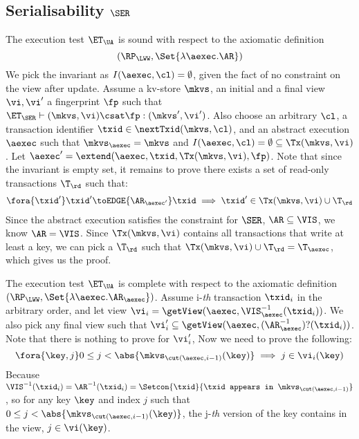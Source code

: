 \subsection{Serialisability \( \SER \)}
\label{sec:sound-complete-ser}

The execution test $\ET_\UA$ is sound with respect to the axiomatic definition 
\[ 
    (\RP_{\LWW}, \Set{\lambda \aexec. \AR })
\]
We pick the invariant as \( I( \aexec, \cl ) = \emptyset \), given the fact of no constraint on the view after update.
Assume a kv-store $\mkvs$, an initial and a final view $\vi, \vi'$  a fingerprint $\fp$ 
such that $\ET_{\SER} \vdash (\mkvs, \vi) \csat \fp: (\mkvs',\vi')$. 
Also choose an arbitrary $\cl$, a transaction identifier $\txid \in \nextTxid(\mkvs, \cl)$, 
and an abstract execution $\aexec$ such that $\mkvs_{\aexec} = \mkvs$ and 
\( I(\aexec, \cl) =  \emptyset \subseteq \Tx(\mkvs, \vi) \).
Let \( \aexec' = \extend(\aexec, \txid, \Tx(\mkvs, \vi), \fp ) \).
Note that since the invariant is empty set, it remains to prove there exists a set of read-only transactions \( \T_\rd \) such that:
\[
    \begin{array}{@{}l@{}}
        \fora{ \txid' } 
        \txid' \toEDGE{\AR_{\aexec'}} \txid \implies \txid' \in \Tx(\mkvs, \vi) \cup \T_\rd
    \end{array}
\]
Since the abstract execution satisfies the constraint for \( \SER \), \ie \( \AR \subseteq \VIS \), we know \( \AR = \VIS \).
Since \( \Tx(\mkvs, \vi)  \) contains all transactions that write at least a key, 
we can pick a \( \T_\rd \) such that \( \Tx(\mkvs, \vi) \cup \T_\rd = \T_\aexec\),
which gives us the proof.


The execution test $\ET_\UA$ is complete with respect to the axiomatic definition \( (\RP_{\LWW}, \Set{\lambda \aexec. \AR_\aexec }) \).
Assume i-\emph{th} transaction \( \txid_i \) in the arbitrary order,
and let view \( \vi_{i} = \getView(\aexec, \VIS^{-1}_{\aexec}(\txid_{i}) ) \).
We also pick any final view such that \( \vi'_{i} \subseteq \getView(\aexec, (\AR^{-1}_{\aexec})?(\txid_{i}) ) \).
Note that there is nothing to prove for \( \vi'_i \),
Now we need to prove the following:
\[
    \fora{\key, j}  0 \leq j < \abs{\mkvs_{\cut(\aexec, i-1)}(\key)} \implies j \in \vi_i(\key)
\]
Because \( \VIS^{-1}(\txid_i) = \AR^{-1}(\txid_i) = \Setcon{\txid }{\txid \texttt{ appears in } \mkvs_{\cut(\aexec, i-1)} }\),
so for any key \( \key \) and index \( j \) such that \( 0 \leq j < \abs{\mkvs_{\cut(\aexec, i-1)}(\key)} \),
the j-\emph{th} version of the key contains in the view, \ie \( j \in \vi(\key)\).

